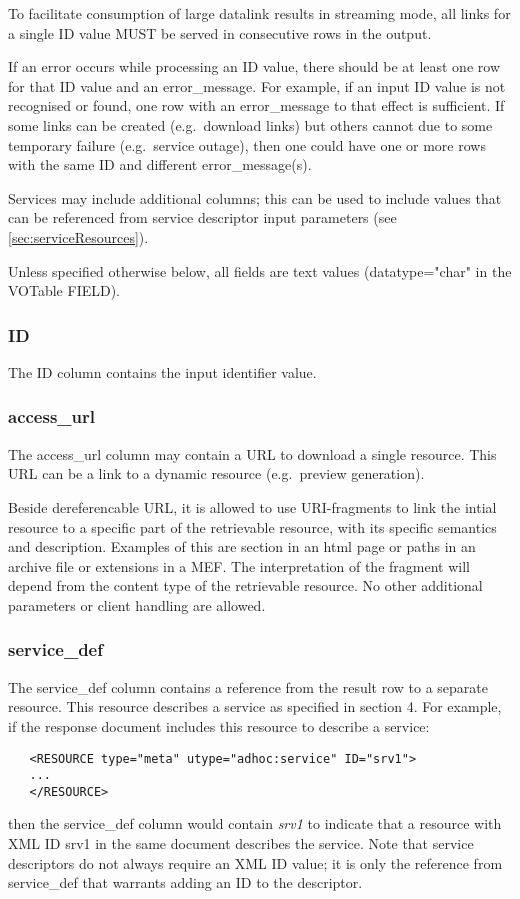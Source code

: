 \documentclass[11pt,a4paper]{ivoa}
\newcommand{\attval}[2]{#1={\allowbreak}{"}#2{"}}
\begin{document}
To facilitate consumption of large datalink results in streaming mode, all links 
for a single ID value MUST be served in consecutive rows in the output.

If an error occurs while processing an ID value, there should be at least
one row for that ID value and an error\_message. For example, if an input
ID value is not recognised or found, one row with an error\_message
to that effect is sufficient.
If some links can be created (e.g.\ download links)
but others cannot due to some temporary failure (e.g.\ service outage),
then one could have one or more rows with the same ID and different
error\_message(s).

Services may include additional columns; this can be used to include
values that can be referenced from service descriptor input parameters
(see \ref{sec:serviceResources}).

Unless specified otherwise below, all fields are text values (\attval{datatype}{char} 
in the VOTable FIELD).

\subsubsection{ID}

The ID column contains the input identifier value.


\subsubsection{access\_url}

The access\_url column may contain a URL to download a single resource.
This URL can be a link to a dynamic resource (e.g.\ preview generation).

Beside dereferencable URL, it is allowed to use URI-fragments to link
the intial resource to a specific part of the retrievable resource, with
its specific semantics and description. Examples of this are section
in an html page or paths in an archive file or extensions in a MEF.
The interpretation of the fragment will depend from the content type
of the retrievable resource.  No other additional parameters or client
handling are allowed.

\subsubsection{service\_def}

The service\_def column contains a reference from the result row to
a separate resource. This resource describes a service as specified
in section 4.
For example, if the response document includes this resource
to describe a service:
\begin{verbatim}
   <RESOURCE type="meta" utype="adhoc:service" ID="srv1">
   ...
   </RESOURCE>
\end{verbatim}
then the service\_def column would contain {\em srv1\/} to indicate that
a resource with XML ID srv1 in the same document describes the service.
Note that service descriptors do not always require an XML ID value;
it is only the reference from service\_def that warrants adding
an ID to the descriptor.
\end{document}
